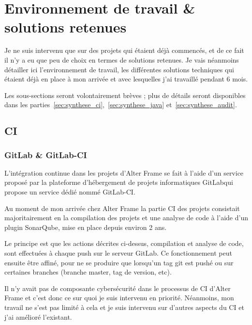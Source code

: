 \section{Environnement de travail \& solutions retenues}
Je ne suis intervenu que sur des projets qui étaient déjà commencés, et de ce fait il n'y a eu que peu de choix en termes de solutions retenues. Je vais néanmoins détailler ici l'environnement de travail, les différentes solutions techniques qui étaient déjà en place à mon arrivée et avec lesquelles j'ai travaillé pendant 6 mois.

Les sous-sections seront volontairement brèves ; plus de détails seront disponibles dans les parties~\ref{sec:synthese_ci},~\ref{sec:synthese_java} et~\ref{sec:synthese_audit}.

\subsection{CI}
\subsubsection{GitLab \& GitLab-CI}
L'intégration continue dans les projets d'Alter Frame se fait à l'aide d'un service proposé par la plateforme d'hébergement de projets informatiques GitLab\cite{gitlab}qui propose un service dédié nommé GitLab-CI\cite{gitlab-ci}.

Au moment de mon arrivée chez Alter Frame la partie CI des projets consistait majoritairement en la compilation des projets et une analyse de code à l'aide d'un plugin SonarQube\cite{sonarqube}, mise en place depuis environ 2 ans.

Le principe est que les actions décrites ci-dessus, compilation et analyse de code, sont effectuées à chaque push sur le serveur GitLab. Ce fonctionnement peut ensuite être affiné, pour ne se produire que lorsqu'un tag git est pushé ou sur certaines branches (branche master, tag de version, etc).

Il n'y avait pas de composante cybersécurité dans le processus de CI d'Alter Frame et c'est donc ce sur quoi je suis intervenu en priorité. Néanmoins, mon travail ne s'est pas limité à cela et je suis intervenu sur d'autres aspects du CI et j'ai amélioré l'existant.

